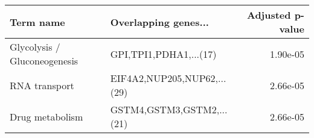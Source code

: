 \begin{tabular}{llr}
\toprule
                   Term name &        Overlapping genes... &  Adjusted p-value \\
\midrule
Glycolysis / Gluconeogenesis &      GPI,TPI1,PDHA1,...(17) &          1.90e-05 \\
               RNA transport & EIF4A2,NUP205,NUP62,...(29) &          2.66e-05 \\
             Drug metabolism &   GSTM4,GSTM3,GSTM2,...(21) &          2.66e-05 \\
\bottomrule
\end{tabular}
